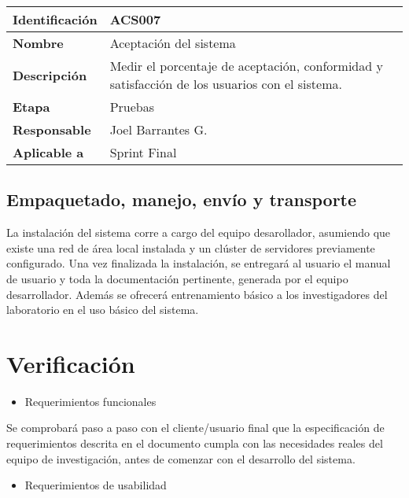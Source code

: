 \documentclass{scrreprt}
\begin{document}
\vspace{0.8cm}

\begin{tabular}{ |p{3cm}|p{10cm}|  }
  \hline
  \textbf{Identificación} & ACS007 \\
  \hline
  \textbf{Nombre} & Aceptación del sistema \\
  \hline
  \textbf{Descripción} & Medir el porcentaje de aceptación, conformidad y satisfacción de los usuarios con el sistema. \\
  \hline
  \textbf{Etapa} & Pruebas \\
  \hline
  \textbf{Responsable} & Joel Barrantes G. \\
  \hline
  \textbf{Aplicable a} & Sprint Final \\
  \hline  
\end{tabular}

\vspace{0.8cm}


\section{Empaquetado, manejo, envío y transporte}

La instalación del sistema corre a cargo del equipo desarollador, asumiendo que existe una red de área local instalada y un clúster de servidores previamente configurado. Una vez finalizada la instalación, se entregará al usuario el manual de usuario y toda la documentación pertinente, generada por el equipo desarrollador. Además se ofrecerá entrenamiento básico a los investigadores del laboratorio en el uso básico del sistema.




\chapter{Verificación}

\begin{itemize}
\item Requerimientos funcionales
\end{itemize}

Se comprobará paso a paso con el cliente/usuario final que la especificación de requerimientos descrita en el documento cumpla con las necesidades reales del equipo de investigación, antes de comenzar con el desarrollo del sistema.

\begin{itemize}
\item Requerimientos de usabilidad
\end{itemize}
\end{document}
